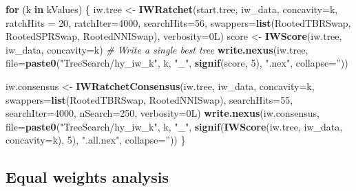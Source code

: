 \documentclass[openany]{book}
\newenvironment{Shaded}{\begin{snugshade}}{\end{snugshade}}
\newcommand{\KeywordTok}[1]{\textcolor[rgb]{0.13,0.29,0.53}{\textbf{#1}}}
\newcommand{\DataTypeTok}[1]{\textcolor[rgb]{0.13,0.29,0.53}{#1}}
\newcommand{\DecValTok}[1]{\textcolor[rgb]{0.00,0.00,0.81}{#1}}
\newcommand{\StringTok}[1]{\textcolor[rgb]{0.31,0.60,0.02}{#1}}
\newcommand{\CommentTok}[1]{\textcolor[rgb]{0.56,0.35,0.01}{\textit{#1}}}
\newcommand{\ControlFlowTok}[1]{\textcolor[rgb]{0.13,0.29,0.53}{\textbf{#1}}}
\newcommand{\NormalTok}[1]{#1}
\begin{document}
\begin{Shaded}
\begin{Highlighting}[]
\ControlFlowTok{for}\NormalTok{ (k }\ControlFlowTok{in}\NormalTok{ kValues) \{}
\NormalTok{  iw.tree <-}\StringTok{ }\KeywordTok{IWRatchet}\NormalTok{(start.tree, iw_data, }\DataTypeTok{concavity=}\NormalTok{k,}
                       \DataTypeTok{ratchHits =} \DecValTok{20}\NormalTok{, }\DataTypeTok{ratchIter=}\DecValTok{4000}\NormalTok{, }\DataTypeTok{searchHits=}\DecValTok{56}\NormalTok{,}
                       \DataTypeTok{swappers=}\KeywordTok{list}\NormalTok{(RootedTBRSwap, RootedSPRSwap, RootedNNISwap),}
                       \DataTypeTok{verbosity=}\NormalTok{0L)}
\NormalTok{  score <-}\StringTok{ }\KeywordTok{IWScore}\NormalTok{(iw.tree, iw_data, }\DataTypeTok{concavity=}\NormalTok{k)}
  \CommentTok{# Write a single best tree}
  \KeywordTok{write.nexus}\NormalTok{(iw.tree,}
              \DataTypeTok{file=}\KeywordTok{paste0}\NormalTok{(}\StringTok{"TreeSearch/hy_iw_k"}\NormalTok{, k, }\StringTok{"_"}\NormalTok{, }
                          \KeywordTok{signif}\NormalTok{(score, }\DecValTok{5}\NormalTok{), }\StringTok{".nex"}\NormalTok{, }\DataTypeTok{collapse=}\StringTok{''}\NormalTok{))}

\NormalTok{  iw.consensus <-}\StringTok{ }\KeywordTok{IWRatchetConsensus}\NormalTok{(iw.tree, iw_data, }\DataTypeTok{concavity=}\NormalTok{k,}
                  \DataTypeTok{swappers=}\KeywordTok{list}\NormalTok{(RootedTBRSwap, RootedNNISwap),}
                  \DataTypeTok{searchHits=}\DecValTok{55}\NormalTok{, }\DataTypeTok{searchIter=}\DecValTok{4000}\NormalTok{, }\DataTypeTok{nSearch=}\DecValTok{250}\NormalTok{, }\DataTypeTok{verbosity=}\NormalTok{0L)}
  \KeywordTok{write.nexus}\NormalTok{(iw.consensus, }
              \DataTypeTok{file=}\KeywordTok{paste0}\NormalTok{(}\StringTok{"TreeSearch/hy_iw_k"}\NormalTok{, k, }\StringTok{"_"}\NormalTok{, }
                          \KeywordTok{signif}\NormalTok{(}\KeywordTok{IWScore}\NormalTok{(iw.tree, iw_data, }\DataTypeTok{concavity=}\NormalTok{k), }\DecValTok{5}\NormalTok{),}
                          \StringTok{".all.nex"}\NormalTok{, }\DataTypeTok{collapse=}\StringTok{''}\NormalTok{))}
\NormalTok{\}}
\end{Highlighting}
\end{Shaded}

\subsection{Equal weights analysis}\label{equal-weights-analysis}
\end{document}

